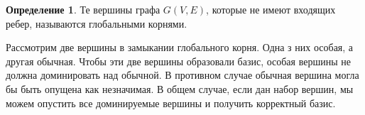 \documentclass[12pt,a4paper,oneside]{article}
\theoremstyle{definition}
\newtheorem{definition}{Определение}[]
\theoremstyle{lemma}
\theoremstyle{remark}
\begin{document}
\begin{definition}
Те вершины графа $G(V,E)$, которые не имеют входящих ребер, называются глобальными корнями.
\end{definition}

Рассмотрим две вершины в замыкании глобального корня. Одна з них особая, а другая обычная. Чтобы эти две вершины образовали базис, особая вершины не должна доминировать над обычной. В противном случае обычная вершина могла бы быть опущена как незначимая. В общем случае, если дан набор вершин, мы можем опустить все доминируемые вершины и получить корректный базис.

\linespread{1.0}
\begin{figure}[H]
	\begin{center}
		\begin{algorithm}[H]
			\SetAlgoLined


\end{algorithm}
\end{center}
\end{figure}
\end{document}
